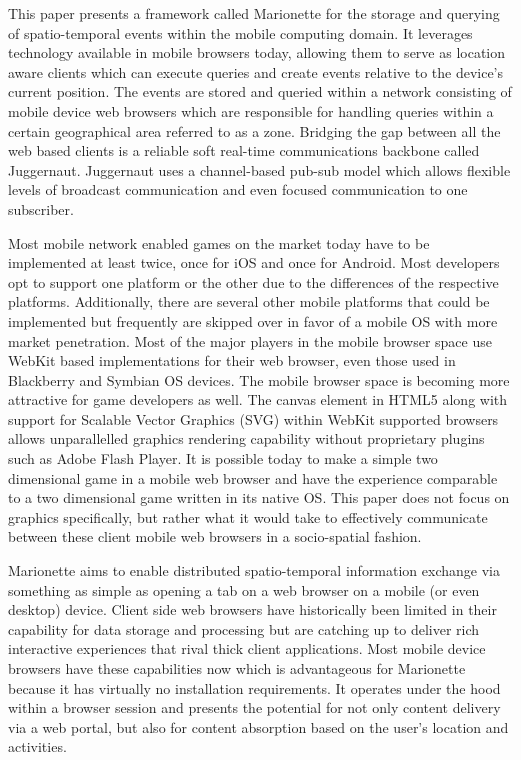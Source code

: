 \documentclass[12pt]{report}	%
\theoremstyle{definition}
\theoremstyle{remark}
\begin{document}
This paper presents a framework called Marionette for the storage and
querying of spatio-temporal events within the mobile computing domain.
It leverages technology available in mobile browsers today, allowing
them to serve as location aware clients which can execute queries and
create events relative to the device's current position. The events are
stored and queried within a network consisting of mobile device web
browsers which are responsible for handling queries within a certain
geographical area referred to as a zone. Bridging the gap between all
the web based clients is a reliable soft real-time communications
backbone called Juggernaut. Juggernaut uses a channel-based pub-sub
model which allows flexible levels of broadcast communication and even
focused communication to one subscriber.

Most mobile network enabled games on the market today have to be
implemented at least twice, once for iOS and once for Android. Most
developers opt to support one platform or the other due to the
differences of the respective platforms. Additionally, there are several
other mobile platforms that could be implemented but frequently are
skipped over in favor of a mobile OS with more market penetration. Most
of the major players in the mobile browser space use WebKit based
implementations for their web browser, even those used in Blackberry and
Symbian OS devices. The mobile browser space is becoming more attractive
for game developers as well. The canvas element in HTML5 along with
support for Scalable Vector Graphics (SVG) within WebKit supported
browsers allows unparallelled graphics rendering capability without
proprietary plugins such as Adobe Flash Player. It is possible today to
make a simple two dimensional game in a mobile web browser and have the
experience comparable to a two dimensional game written in its native
OS. This paper does not focus on graphics specifically, but rather what
it would take to effectively communicate between these client mobile web
browsers in a socio-spatial fashion.

Marionette aims to enable distributed spatio-temporal information
exchange via something as simple as opening a tab on a web browser on a
mobile (or even desktop) device. Client side web browsers have
historically been limited in their capability for data storage and
processing but are catching up to deliver rich interactive experiences
that rival thick client applications. Most mobile device browsers have
these capabilities now which is advantageous for Marionette because it
has virtually no installation requirements. It operates under the hood
within a browser session and presents the potential for not only content
delivery via a web portal, but also for content absorption based on the
user's location and activities.
\end{document}
